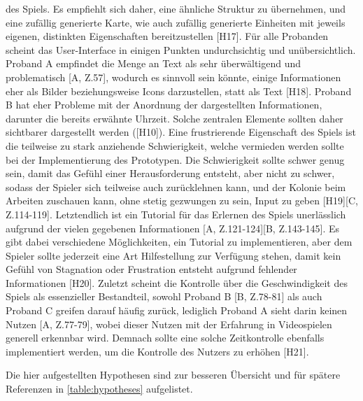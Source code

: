 des Spiels. Es empfiehlt sich daher, eine ähnliche Struktur zu übernehmen, und eine zufällig generierte Karte, wie auch zufällig generierte Einheiten mit jeweils eigenen, distinkten Eigenschaften bereitzustellen [H17]. Für alle Probanden scheint das User-Interface in einigen Punkten undurchsichtig und unübersichtlich. Proband A empfindet die Menge an Text als sehr überwältigend und problematisch [A, Z.57], wodurch es sinnvoll sein könnte, einige Informationen eher als Bilder beziehungsweise Icons darzustellen, statt als Text [H18]. Proband B hat eher Probleme mit der Anordnung der dargestellten Informationen, darunter die bereits erwähnte Uhrzeit. Solche zentralen Elemente sollten daher sichtbarer dargestellt werden ([H10]). Eine frustrierende Eigenschaft des Spiels ist die teilweise zu stark anziehende Schwierigkeit, welche vermieden werden sollte bei der Implementierung des Prototypen. Die Schwierigkeit sollte schwer genug sein, damit das Gefühl einer Herausforderung entsteht, aber nicht zu schwer, sodass der Spieler sich teilweise auch zurücklehnen kann, und der Kolonie beim Arbeiten zuschauen kann, ohne stetig gezwungen zu sein, Input zu geben [H19][C, Z.114-119]. Letztendlich ist ein Tutorial für das Erlernen des Spiels unerlässlich aufgrund der vielen gegebenen Informationen [A, Z.121-124][B, Z.143-145]. Es gibt dabei verschiedene Möglichkeiten, ein Tutorial zu implementieren, aber dem Spieler sollte jederzeit eine Art Hilfestellung zur Verfügung stehen, damit kein Gefühl von Stagnation oder Frustration entsteht aufgrund fehlender Informationen [H20]. Zuletzt scheint die Kontrolle über die Geschwindigkeit des Spiels als essenzieller Bestandteil, sowohl Proband B [B, Z.78-81] als auch Proband C greifen darauf häufig zurück, lediglich Proband A sieht darin keinen Nutzen [A, Z.77-79], wobei dieser Nutzen mit der Erfahrung in Videospielen generell erkennbar wird. Demnach sollte eine solche Zeitkontrolle ebenfalls implementiert werden, um die Kontrolle des Nutzers zu erhöhen [H21]. 

Die hier aufgestellten Hypothesen sind zur besseren Übersicht und für spätere Referenzen in \autoref{table:hypotheses} aufgelistet.
 

